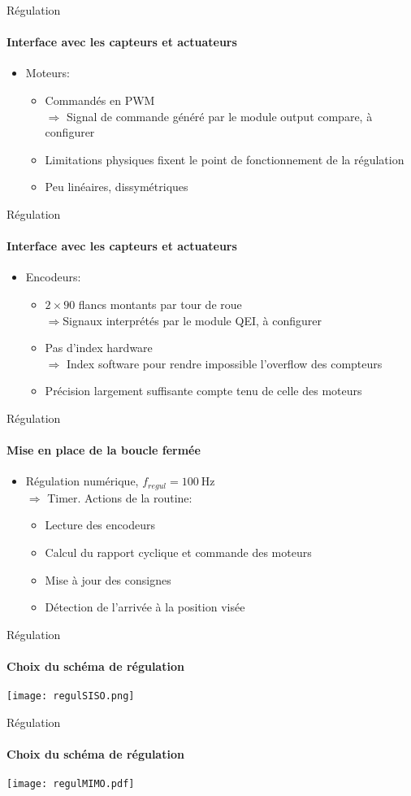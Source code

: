 \begin{frame}{Régulation}
\framesubtitle{Interface avec les capteurs et actuateurs}
\begin{itemize}
  \item Moteurs:
  \begin{itemize}
  \item Commandés en PWM\\
  $\Rightarrow$ Signal de commande généré par le module output compare, à configurer
  \item Limitations physiques fixent le point de fonctionnement de la régulation
  \item Peu linéaires, dissymétriques
  \end{itemize}
\end{itemize}
\end{frame}

\begin{frame}{Régulation}
\framesubtitle{Interface avec les capteurs et actuateurs}
\begin{itemize}
  \item Encodeurs:
  \begin{itemize}
    \item $2\times90$ flancs montants par tour de roue\\
    $\Rightarrow$Signaux interprétés par le module QEI, à configurer
    \item Pas d'index hardware\\
    $\Rightarrow$ Index software pour rendre impossible l'overflow des compteurs
    \item Précision largement suffisante compte tenu de celle des moteurs
  \end{itemize}
\end{itemize}
\end{frame}

\begin{frame}{Régulation}
\framesubtitle{Mise en place de la boucle fermée}
\begin{itemize}
  \item Régulation numérique, $f_{regul} = \SI{100}{\hertz}$\\
  $\Rightarrow$ Timer. Actions de la routine:
  \begin{itemize}
    \item Lecture des encodeurs
    \item Calcul du rapport cyclique et commande des moteurs
    \item Mise à jour des consignes
    \item Détection de l'arrivée à la position visée
  \end{itemize}
\end{itemize}
\end{frame}

\begin{frame}{Régulation}
\framesubtitle{Choix du schéma de régulation}
\texttt{[image: regulSISO.png]}
\end{frame}

\begin{frame}{Régulation}
\framesubtitle{Choix du schéma de régulation}
\texttt{[image: regulMIMO.pdf]}
\end{frame}
